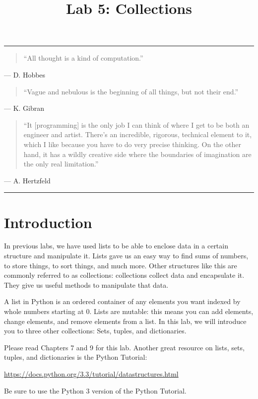 \documentclass[11pt]{cselabheader}
\title{Lab 5: Collections}
\begin{document}
\maketitle

\hrule
\begin{quotation}
``All thought is a kind of computation.''
\end{quotation}
\begin{flushright}
--- D. Hobbes
\end{flushright}

\begin{quotation}
``Vague and nebulous is the beginning of all things, but not their end.''
\end{quotation}
\begin{flushright}
--- K. Gibran
\end{flushright}

\begin{quotation}
``It [programming] is the only job I can think of where I get to be both an
engineer and artist. There's an incredible, rigorous, technical element to it,
which I like because you have to do very precise thinking. On the other hand, it
has a wildly creative side where the boundaries of imagination are the only real
limitation.''
\end{quotation}
\begin{flushright}
--- A. Hertzfeld
\end{flushright}

\hrule

\section{Introduction}

In previous labs, we have used lists to be able to enclose data in a certain
structure and manipulate it. Lists gave us an easy way to find sums of numbers,
to store things, to sort things, and much more. Other structures like this are
commonly referred to as collections: collections collect data and encapsulate
it. They give us useful methods to manipulate that data.

A list in Python is an ordered container of any elements you want indexed by
whole numbers starting at 0. Lists are mutable: this means you can add elements,
change elements, and remove elements from a list. In this lab, we will introduce
you to three other collections: Sets, tuples, and dictionaries. 

Please read Chapters 7 and 9 for this lab. Another great resource on lists,
sets, tuples, and dictionaries is the Python Tutorial:
\begin{center}
  \url{https://docs.python.org/3.3/tutorial/datastructures.html}
\end{center}
Be sure to use the Python 3 version of the Python Tutorial.
\end{document}
